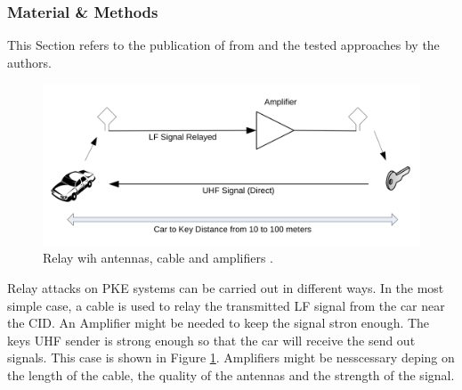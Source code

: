 \subsubsection*{Material \& Methods}
	\label{sec:matmet}
	This Section refers to the publication of \citeauthor{relayAttacksFranc} from \citeyear{relayAttacksFranc}
	and the tested approaches by the authors.

	\begin{figure}[htb]
		\begin{center}
			\includegraphics[width=\textwidth]{pictures/franc_relay_over_the_wire.png}
		\end{center}
		\caption{Relay wih antennas, cable and amplifiers \citep[p. 5]{relayAttacksFranc}.}
		\label{fig:relayOTW}
	\end{figure}

	Relay  attacks on PKE systems can be carried out in different ways.
	In the most simple case,
	a cable is used to relay the transmitted LF signal from the car near the CID.
	An Amplifier might be needed to keep the signal stron enough.
	The keys UHF sender is strong enough so that the car will receive the send out signals.
	This case is shown in Figure \ref{fig:relayOTW}.
	Amplifiers might be nesscessary deping on the length of the cable,
	the quality of the antennas and the strength of the signal.

